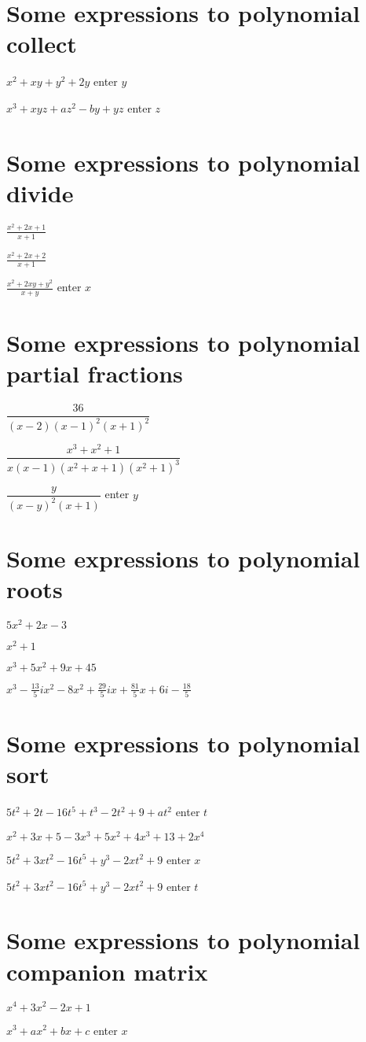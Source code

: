\documentclass{article}
\begin{document}
\section{Some expressions to polynomial collect}

$x^{2}+xy+y^{2}+2y$ enter $y$

$x^{3}+xyz+az^{2}-by+yz$ enter $z$

\section{Some expressions to polynomial divide}

$\frac{x^{2}+2x+1}{x+1}$

$\frac{x^{2}+2x+2}{x+1}$

$\frac{x^{2}+2xy+y^{2}}{x+y}$ enter $x$

\section{Some expressions to polynomial partial fractions}

$\dfrac{36}{\left( x-2\right) \left( x-1\right) ^{2}\left( x+1\right) ^{2}}$

$\dfrac{x^{3}+x^{2}+1}{x\left( x-1\right) \left( x^{2}+x+1\right) \left(
x^{2}+1\right) ^{3}}$

$\dfrac{y}{(x-y)^{2}(x+1)}$ enter $y$

\section{Some expressions to polynomial roots}

$5x^{2}+2x-3$

$x^{2}+1$

$x^{3}+5x^{2}+9x+45$

$x^{3}-\frac{13}{5}ix^{2}-8x^{2}+\frac{29}{5}ix+\frac{81}{5}x+6i-\frac{18}{5}
$

\section{Some expressions to polynomial sort}

$5t^{2}+2t-16t^{5}+t^{3}-2t^{2}+9+at^{2}$ enter $t$

$x^{2}+3x+5-3x^{3}+5x^{2}+4x^{3}+13+2x^{4}$

$5t^{2}+3xt^{2}-16t^{5}+y^{3}-2xt^{2}+9$ enter $x$

$5t^{2}+3xt^{2}-16t^{5}+y^{3}-2xt^{2}+9$ enter $t$

\section{Some expressions to polynomial companion matrix}

$x^{4}+3x^{2}-2x+1$

$x^{3}+ax^{2}+bx+c$ enter $x$
\end{document}
